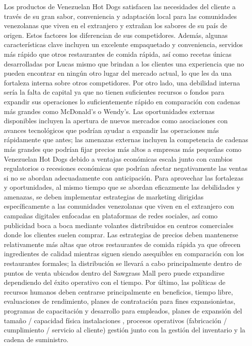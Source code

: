 Los productos de Venezuelan Hot Dogs satisfacen las necesidades del cliente a través de su gran sabor, conveniencia y adaptación local para las comunidades venezolanas que viven en el extranjero y extrañan los sabores de su país de origen. Estos factores los diferencian de sus competidores. Además, algunas características clave incluyen un excelente empaquetado y conveniencia, servidos más rápido que otros restaurantes de comida rápida, así como recetas únicas desarrolladas por Lucas mismo que brindan a los clientes una experiencia que no pueden encontrar en ningún otro lugar del mercado actual, lo que les da una fortaleza interna sobre otros competidores. Por otro lado, una debilidad interna sería la falta de capital ya que no tienen suficientes recursos o fondos para expandir sus operaciones lo suficientemente rápido en comparación con cadenas más grandes como McDonald's o Wendy's. Las oportunidades externas disponibles incluyen la apertura de nuevos mercados como asociaciones con avances tecnológicos que podrían ayudar a expandir las operaciones más rápidamente que antes; las amenazas externas incluyen la competencia de cadenas más grandes que podrían fijar precios más altos a empresas más pequeñas como Venezuelan Hot Dogs debido a ventajas económicas escala junto con cambios regulatorios o recesiones económicas que podrían afectar negativamente las ventas si no se abordan adecuadamente con anticipación.
Para aprovechar las fortalezas y oportunidades, al mismo tiempo que se abordan eficazmente las debilidades y amenazas, se deben implementar estrategias de marketing dirigidas específicamente a las comunidades venezolanas que viven en el extranjero con campañas digitales enfocadas en plataformas de redes sociales, así como publicidad boca a boca mediante volantes distribuidos en centros comerciales donde los clientes suelen comprar. Las estrategias de precios deben mantenerse relativamente más altas que otros restaurantes de comida rápida ya que ofrecen ingredientes de calidad mientras siguen siendo asequibles en comparación con los restaurantes formales; la distribución se llevará a cabo principalmente dentro de puntos de venta ubicados dentro del Sawgrass Mall pero puede expandirse dependiendo del éxito operativo con el tiempo. Por último, las políticas de recursos humanos deben centrarse principalmente en beneficios, tiempo libre, evaluaciones de rendimiento, planes de contratación para fines expansionistas, programas de capacitación y desarrollo para empleados, planes de expansión del tamaño / capacidad física instalaciones , procesos operativos (fabricación / cumplimiento / servicio al cliente) gestión junto con la gestión del inventario y la cadena de suministro.
